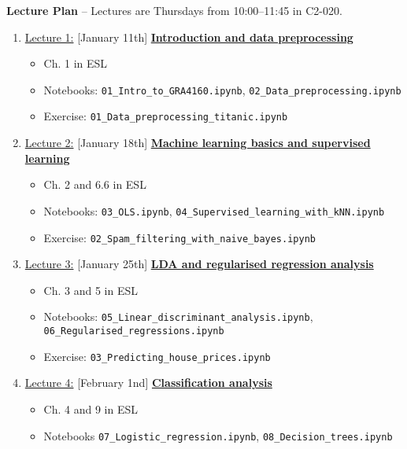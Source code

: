 \documentclass[12pt, a4paper]{article}
\begin{document}
\newpage
\noindent\textbf{\large Lecture Plan}
 -- Lectures are Thursdays from 10:00--11:45 in C2-020. \\
\begin{enumerate}
  \item[] \underline{Lecture 1:} [January 11th] \underline{\bf Introduction and data preprocessing}
     {\small
         \begin{itemize}
             \item Ch. 1 in ESL
             \item Notebooks: \texttt{01\_Intro\_to\_GRA4160.ipynb}, \texttt{02\_Data\_preprocessing.ipynb}
             \item Exercise: \texttt{01\_Data\_preprocessing\_titanic.ipynb}
         \end{itemize}
     }
  \item[] \underline{Lecture 2:} [January 18th] \underline{\bf Machine learning basics and supervised learning}
    {\small
          \begin{itemize}
                \item Ch. 2 and 6.6 in ESL
                \item Notebooks: \texttt{03\_OLS.ipynb}, \texttt{04\_Supervised\_learning\_with\_kNN.ipynb}
                \item Exercise: \texttt{02\_Spam\_filtering\_with\_naive\_bayes.ipynb}
          \end{itemize}
    }
  \item[] \underline{Lecture 3:} [January 25th] \underline{\bf LDA and regularised regression analysis}
    {\small
          \begin{itemize}
              \item Ch. 3 and 5 in ESL
              \item Notebooks: \texttt{05\_Linear\_discriminant\_analysis.ipynb}, \texttt{06\_Regularised\_regressions.ipynb}
              \item Exercise: \texttt{03\_Predicting\_house\_prices.ipynb}
          \end{itemize}
    }
  \item [] \underline{Lecture 4:} [February 1nd] \underline{\bf Classification analysis}
    {\small
            \begin{itemize}
                \item Ch. 4 and 9 in ESL
                \item Notebooks \texttt{07\_Logistic\_regression.ipynb}, \texttt{08\_Decision\_trees.ipynb}

\end{itemize}}
\end{enumerate}
\end{document}
